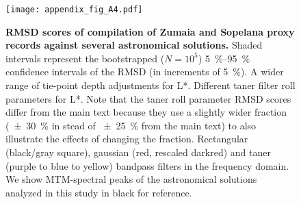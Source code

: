 \documentclass[]{agujournal2019}
\begin{document}
\begin{figure}
    \centering
    \texttt{[image: appendix\_fig\_A4.pdf]}
    \caption{
        \label{fig:full-RMSD-boot}
        \label{fig:full-RMSD-tie-error}
        \label{fig:full-RMSD-taner}
        \label{fig:filter-windows}
        \textbf{\gls{RMSD} scores of compilation of Zumaia and Sopelana proxy records against several astronomical solutions.}
        Shaded intervals represent the bootstrapped (\(N = 10^{5}\)) \qtyrange{5}{95}{\percent} confidence intervals of the \gls{RMSD} (in increments of \qty{5}{\percent}).
        A wider range of tie-point depth adjustments for \gls{L*}.
        Different taner filter roll parameters for \gls{L*}.
        Note that the taner roll parameter \gls{RMSD} scores differ from the main text because they use a slightly wider fraction (\qty{\pm30}{\percent} in stead of \qty{\pm25}{\percent} from the main text) to also illustrate the effects of changing the fraction.
        Rectangular (black/gray square), gaussian (red, rescaled darkred) and taner (purple to blue to yellow) bandpass filters in the frequency domain.
        We show MTM-spectral peaks of the astronomical solutions analyzed in this study in black for reference.
    }
\end{figure}
\end{document}
